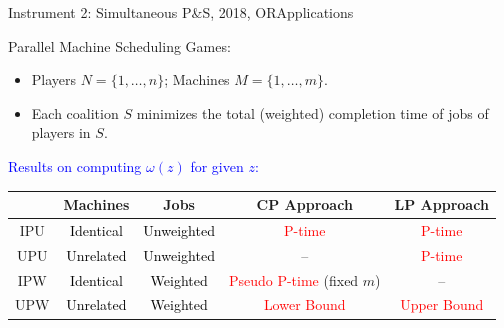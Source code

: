 \documentclass[14pt]{beamer}
\begin{document}
\begin{frame}{Instrument 2: Simultaneous P\&S, {\footnotesize 2018, OR}}{Applications}

{\small
Parallel Machine Scheduling Games:
\begin{itemize}
\small
	\item Players $N = \{1,\ldots,n\}$; Machines $M = \{1,\ldots,m\}$.
	\item Each coalition $S$ minimizes the total (weighted) completion time of jobs of players in $S$. %
\end{itemize}
\vspace{3pt}
\textcolor{blue}{Results on computing $\omega(z)$ for given $z$:}
\begin{table}[H]
\small
	\vspace{-5pt}
	\centering
	\tabcolsep=3pt
\footnotesize
	\renewcommand\arraystretch{1.35}
	\begin{tabular}[!h]{c c c c c}
		\hline
		\multicolumn{1}{c}{} &\multicolumn{1}{c}{Machines} &\multicolumn{1}{c}{Jobs}	&\multicolumn{1}{c}{CP Approach}	&\multicolumn{1}{c}{LP Approach}\\
		\hline
		IPU		&\textcolor{black}{Identical}		&\textcolor{black}{Unweighted} 	&\textcolor{red}{P-time}	&\textcolor{red}{P-time}\\

		UPU		&\textcolor{black}{Unrelated}	&\textcolor{black}{Unweighted}	&--	&\textcolor{red}{P-time}\\

		IPW		&\textcolor{black}{Identical}		&\textcolor{black}{Weighted}	&\textcolor{red}{Pseudo P-time} (fixed $m$)	&--		\\

		UPW		&\textcolor{black}{Unrelated}	&\textcolor{black}{Weighted}	&\textcolor{red}{Lower Bound}	&\textcolor{red}{Upper Bound}\\
		\hline
	\end{tabular}
\end{table}
}
\end{frame}
\end{document}
